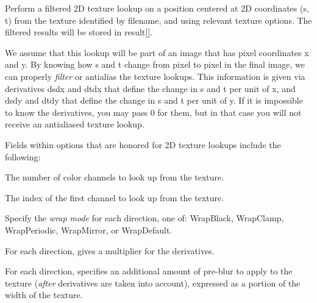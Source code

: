 
Perform a filtered 2D texture lookup on a position centered at 2D
coordinates ({\cf s}, {\cf t}) from the texture identified by
{\cf filename}, and using relevant texture {\cf options}.  The filtered
results will be stored in {\cf result[]}.

We assume that this lookup will be part of an image that has pixel
coordinates {\cf x} and {\cf y}.  By knowing how {\cf s} and {\cf t}
change from pixel to pixel in the final image, we can properly
\emph{filter} or antialias the texture lookups.  This information is
given via derivatives {\cf dsdx} and {\cf dtdx} that define the change
in {\cf s} and {\cf t} per unit of {\cf x}, and {\cf dsdy} and {\cf
  dtdy} that define the change in {\cf s} and {\cf t} per unit of {\cf
  y}.  If it is impossible to know the derivatives, you may pass 0 for
them, but in that case you will not receive an antialiased texture lookup.

Fields within {\cf options} that are honored for 2D texture lookups
include the following:

\vspace{-12pt}
\vspace{10pt}
The number of color channels to look up from the texture.
\apiend

\vspace{-24pt}
\vspace{10pt}
The index of the first channel to look up from the texture.
\apiend

\vspace{-24pt}
\vspace{10pt}
Specify the \emph{wrap mode} for each direction, one of: 
{\cf WrapBlack}, {\cf WrapClamp}, {\cf WrapPeriodic}, {\cf WrapMirror},
or {\cf WrapDefault}.
\apiend

\vspace{-24pt}
\vspace{10pt}
For each direction, gives a multiplier for the derivatives.
\apiend

\vspace{-24pt}
\vspace{10pt}
For each direction, specifies an additional amount of pre-blur to apply
to the texture (\emph{after} derivatives are taken into account),
expressed as a portion of the width of the texture.
\apiend

